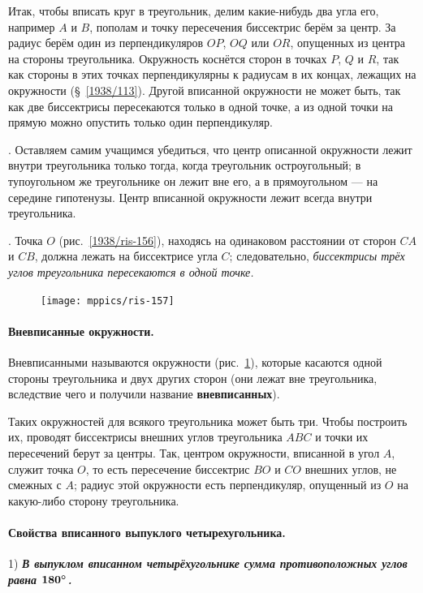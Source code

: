 \documentclass[twoside]{book}
\makeatletter
\newcommand{\rindex}[2][\imki@jobname]{%
  \index[#1]{\detokenize{#2}}%
}
\makeatother
\begin{document}
Итак, чтобы вписать круг в треугольник, делим какие-нибудь два угла его, например $A$ и $B$, пополам и точку пересечения биссектрис берём за центр.
За радиус берём один из перпендикуляров $OP$, $OQ$ или $OR$, опущенных из центра на стороны треугольника.
Окружность коснётся сторон в точках $P$, $Q$ и $R$, так как стороны в этих точках перпендикулярны к радиусам в их концах, лежащих на окружности (§~\ref{1938/113}).
Другой вписанной окружности не может быть, так как две биссектрисы пересекаются только в одной точке, а из одной точки на прямую можно опустить только один перпендикуляр.

{\sloppy 

\smallskip
{}.
Оставляем самим учащимся убедиться, что центр описанной окружности лежит внутри треугольника только тогда, когда треугольник остроугольный;
в тупоугольном же треугольнике он лежит вне его, а в прямоугольном — на середине гипотенузы.
Центр вписанной окружности лежит всегда внутри треугольника.

}

\smallskip
{}.
Точка $O$ (рис.~\ref{1938/ris-156}), находясь на одинаковом расстоянии от сторон $CA$ и $CB$, должна лежать на биссектрисе угла $C$;
следовательно, \emph{биссектрисы трёх углов треугольника пересекаются в одной точке.}

\begin{figure}
\vskip-4mm
\centering
\texttt{[image: mppics/ris-157]}
\caption{}\label{1938/ris-157}
\end{figure}

\paragraph{Вневписанные окружности.}\label{1938/138}
Вневписанными называются окружности (рис.~\ref{1938/ris-157}), которые касаются одной стороны треугольника и  двух других сторон (они лежат вне треугольника, вследствие чего и получили название \rindex{вневписанная окружность}\textbf{вневписанных}).


Таких окружностей для всякого треугольника может быть три.
Чтобы построить их, проводят биссектрисы внешних углов треугольника $ABC$ и точки их пересечений берут за центры.
Так, центром окружности, вписанной в угол $A$, служит точка $O$, то есть
пересечение биссектрис $BO$ и $CO$ внешних углов, не смежных с $A$;
радиус этой окружности есть перпендикуляр, опущенный из $O$ на какую-либо сторону треугольника.

\paragraph{Свойства вписанного выпуклого четырехугольника.}\label{1938/139}
1) \textbf{\emph{В выпуклом вписанном четырёхугольнике сумма противоположных углов равна $\bm{180\degree}$.}}
\end{document}
